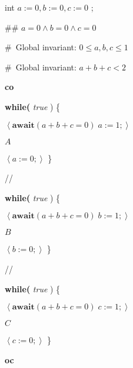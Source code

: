 \documentclass[11pt]{article}%
\begin{document}
\begin{code}
int $a:=0,b:=0,c:=0$ ;

\#\# $a=0\wedge b=0\wedge c=0$

\#\ Global invariant: $0\leq a,b,c\leq1$

\#\ Global invariant: $a+b+c<2$

\textbf{co}

\begin{indent}


\item \textbf{while(} \textit{true} ) \{

\begin{indent}
\item $\left\langle \mathbf{await}(a+b+c=0)\;a:=1;\right\rangle $

\item $A$

\item $\left\langle a:=0;\right\rangle $ \}
\end{indent}
\end{indent}

//

\begin{indent}
\item \textbf{while(} \textit{true} ) \{

\begin{indent}
\item $\left\langle \mathbf{await}(a+b+c=0)\;b:=1;\right\rangle $

\item $B$

\item $\left\langle b:=0;\right\rangle $ \}
\end{indent}
\end{indent}

//

\begin{indent}
\item \textbf{while(} \textit{true} ) \{

\begin{indent}
\item $\left\langle \mathbf{await}(a+b+c=0)\;c:=1;\right\rangle $

\item $C$

\item $\left\langle c:=0;\right\rangle $ \}
\end{indent}
\end{indent}

\textbf{oc}
\end{code}
\end{document}
